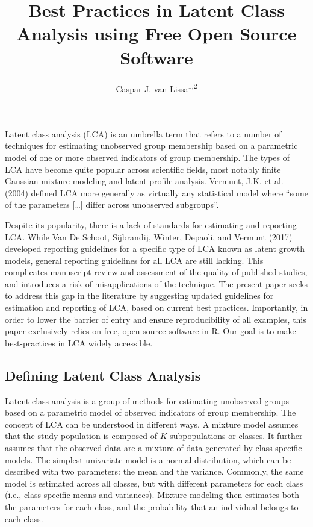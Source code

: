 \documentclass[
  ,man,floatsintext]{apa6}
\title{Best Practices in Latent Class Analysis using Free Open Source Software}
\author{Caspar J. van Lissa\textsuperscript{1,2}}
\date{}
\affiliation{\vspace{0.5cm}\textsuperscript{1} Utrecht University, Methodology \& Statistics\\\textsuperscript{2} Open Science Community Utrecht}
\begin{document}
\maketitle

Latent class analysis (LCA) is an umbrella term
that refers to a number of techniques for estimating unobserved group membership
based on a parametric model of one or more observed indicators of group membership.
The types of LCA have become quite popular across scientific fields,
most notably finite Gaussian mixture modeling and latent profile analysis.
Vermunt, J.K. et al. (2004) defined LCA more generally as virtually any statistical model
where ``some of the parameters {[}\ldots{]} differ across unobserved subgroups''.

Despite its popularity, there is a lack of standards for estimating and reporting LCA.
While Van De Schoot, Sijbrandij, Winter, Depaoli, and Vermunt (2017) developed reporting guidelines
for a specific type of LCA known as latent growth models,
general reporting guidelines for all LCA are still lacking.
This complicates manuscript review and assessment of the quality of published studies,
and introduces a risk of misapplications of the technique.
The present paper seeks to address this gap in the literature
by suggesting updated guidelines for estimation and reporting of LCA,
based on current best practices.
Importantly, in order to lower the barrier of entry and ensure reproducibility of all examples,
this paper exclusively relies on free, open source software in R.
Our goal is to make best-practices in LCA widely accessible.

\hypertarget{defining-latent-class-analysis}{%
\subsection{Defining Latent Class Analysis}\label{defining-latent-class-analysis}}

Latent class analysis is a group of methods for estimating unobserved groups
based on a parametric model of observed indicators of group membership.
The concept of LCA can be understood in different ways.
A mixture model assumes that the study population
is composed of \(K\) subpopulations or classes.
It further assumes that the observed data are a mixture of data generated by class-specific models.
The simplest univariate model is a normal distribution,
which can be described with two parameters: the mean and the variance.
Commonly, the same model is estimated across all classes,
but with different parameters for each class (i.e., class-specific means and variances).
Mixture modeling then estimates both the parameters for each class,
and the probability that an individual belongs to each class.
\end{document}
